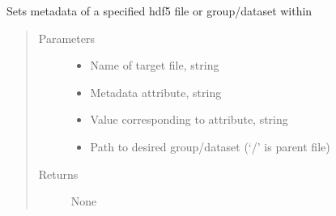 \documentclass[letterpaper,10pt,english]{sphinxmanual}
\begin{document}

\begin{fulllineitems}
\label{\detokenize{index:HDF5Methods.setMetadata}}
\sphinxAtStartPar
Sets metadata of a specified hdf5 file or group/dataset within
\begin{quote}\begin{description}
\item[{Parameters}] \leavevmode\begin{itemize}
\item {} 
\sphinxAtStartPar
{} \textendash{} Name of target file, string

\item {} 
\sphinxAtStartPar
{} \textendash{} Metadata attribute, string

\item {} 
\sphinxAtStartPar
{} \textendash{} Value corresponding to attribute, string

\item {} 
\sphinxAtStartPar
{} \textendash{} Path to desired group/dataset (‘/’ is parent file)

\end{itemize}

\item[{Returns}] \leavevmode
\sphinxAtStartPar
None

\end{description}\end{quote}

\end{fulllineitems}

\end{document}
